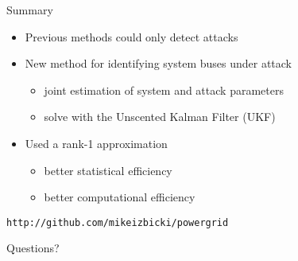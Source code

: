 \documentclass{beamer}
\begin{document}






\begin{frame}{Summary}
\Large
\begin{itemize}
\item Previous methods could only detect attacks

\vspace{0.15in}
\item New method for identifying system buses under attack
\vspace{-0.15in}
\begin{itemize}
\Large
\item joint estimation of system and attack parameters
\item solve with the Unscented Kalman Filter (UKF)
\end{itemize}

\vspace{0.15in}
\item Used a rank-1 approximation 
\begin{itemize}
\Large
\item better statistical efficiency
\item better computational efficiency
\end{itemize}
\end{itemize}

\begin{center}
\texttt{http://github.com/mikeizbicki/powergrid}
\end{center}

\pause
\begin{center}
{
\Huge
Questions?
}
\end{center}
\end{frame}

\end{document}
